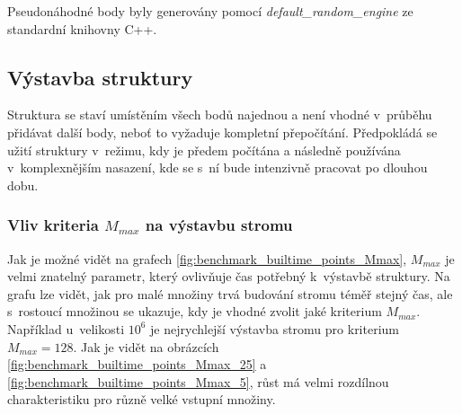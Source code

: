Pseudonáhodné body byly generovány pomocí \emph{default\_random\_engine} ze standardní knihovny C++.

\subsection*{Výstavba struktury}
Struktura se staví umístěním všech bodů najednou a není vhodné v~průběhu přidávat další body, neboť to vyžaduje kompletní přepočítání. Předpokládá se užití struktury v~režimu, kdy je předem počítána a následně používána v~komplexnějším nasazení, kde se s~ní bude intenzivně pracovat po dlouhou dobu.


\subsubsection{Vliv kriteria $M_{max}$ na výstavbu stromu}

Jak je možné vidět na grafech \ref{fig:benchmark_builtime_points_Mmax}, $M_{max}$ je velmi znatelný parametr, který ovlivňuje čas potřebný k~výstavbě struktury. Na grafu lze vidět, jak pro malé množiny trvá budování stromu téměř stejný čas, ale s~rostoucí množinou se ukazuje, kdy je vhodné zvolit jaké kriterium $M_{max}$. Například u~velikosti $10^6$ je nejrychlejší výstavba stromu pro kriterium $M_{max}=128$. Jak je vidět na obrázcích \ref{fig:benchmark_builtime_points_Mmax_25} a \ref{fig:benchmark_builtime_points_Mmax_5}, růst má velmi rozdílnou charakteristiku pro různě velké vstupní množiny.

